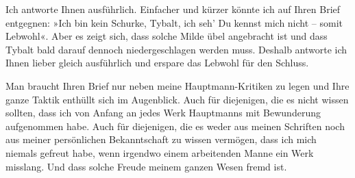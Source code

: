 \pstart
           Ich antworte Ihnen ausführlich. Einfacher und kürzer {\pb}könnte ich auf Ihren Brief
               entgegnen: »Ich bin kein Schurke,
                  Tybalt, ich seh’ Du kennst mich nicht – somit Lebwohl«. Aber es zeigt sich, dass
               solche Milde übel angebracht ist und dass Tybalt bald darauf dennoch niedergeschlagen werden muss.
               Deshalb antworte ich Ihnen lieber gleich ausführlich und erspare das Lebwohl für den
               Schluss.\pend
           
\pstart
           Man braucht Ihren Brief nur neben meine Hauptmann-Kritiken zu legen und Ihre
               ganze Taktik enthüllt sich im Augenblick. Auch für diejenigen, die es nicht wissen
               sollten, dass ich von Anfang an jedes Werk Hauptmanns mit Bewunderung aufgenommen habe. Auch für diejenigen, die es
               weder aus meinen Schriften noch aus meiner persönlichen Bekanntschaft zu wissen
               vermögen, dass ich mich niemals gefreut habe, wenn irgendwo einem arbeitenden Manne
               ein Werk misslang. Und dass solche Freude meinem ganzen Wesen fremd ist.\pend
           
